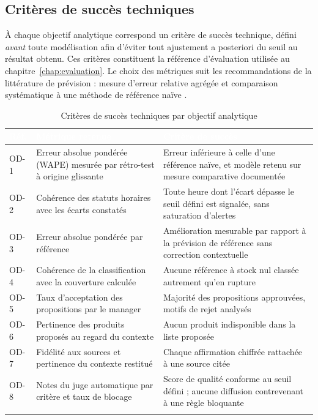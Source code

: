 \subsection{Critères de succès techniques}

À chaque objectif analytique correspond un critère de succès technique, défini \textit{avant} toute modélisation afin d'éviter tout ajustement a posteriori du seuil au résultat obtenu. Ces critères constituent la référence d'évaluation utilisée au chapitre~\ref{chap:evaluation}. Le choix des métriques suit les recommandations de la littérature de prévision : mesure d'erreur relative agrégée et comparaison systématique à une méthode de référence naïve \cite{hyndman2021fpp,makridakis2020m4}.

\begin{longtable}{|P{1.3cm}|P{5.6cm}|P{7.1cm}|}
\hline
{}
\textcolor{white}{\textbf{Réf.}} &
\textcolor{white}{\textbf{Métrique retenue}} &
\textcolor{white}{\textbf{Critère de succès}} \\
\hline
\endhead
\hline
\endfoot
\hline
\endlastfoot
OD-1 & Erreur absolue pondérée (WAPE) mesurée par rétro-test à origine glissante & Erreur inférieure à celle d'une référence naïve, et modèle retenu sur mesure comparative documentée \\
\hline
OD-2 & Cohérence des statuts horaires avec les écarts constatés & Toute heure dont l'écart dépasse le seuil défini est signalée, sans saturation d'alertes \\
\hline
OD-3 & Erreur absolue pondérée par référence & Amélioration mesurable par rapport à la prévision de référence sans correction contextuelle \\
\hline
OD-4 & Cohérence de la classification avec la couverture calculée & Aucune référence à stock nul classée autrement qu'en rupture \\
\hline
OD-5 & Taux d'acceptation des propositions par le manager & Majorité des propositions approuvées, motifs de rejet analysés \\
\hline
OD-6 & Pertinence des produits proposés au regard du contexte & Aucun produit indisponible dans la liste proposée \\
\hline
OD-7 & Fidélité aux sources et pertinence du contexte restitué & Chaque affirmation chiffrée rattachée à une source citée \\
\hline
OD-8 & Notes du juge automatique par critère et taux de blocage & Score de qualité conforme au seuil défini ; aucune diffusion contrevenant à une règle bloquante \\
\hline
\caption{Critères de succès techniques par objectif analytique}
\label{tab:criteres-succes-chap2}
\end{longtable}

